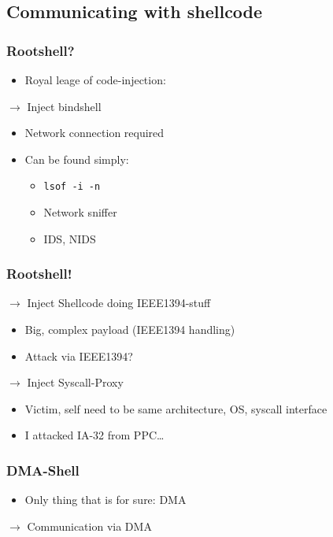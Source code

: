 \documentclass{beamer}
\begin{document}
	\subsection{Communicating with shellcode}

		\begin{frame} \frametitle{Rootshell?}
			\begin{itemize}
				\item Royal leage of code-injection: 
			\end{itemize}
			$\rightarrow$ Inject bindshell
			\begin{itemize}
				\item Network connection required
				\item Can be found simply:
				\begin{itemize}
					\item \texttt{lsof -i -n}
					\item Network sniffer
					\item IDS, NIDS
				\end{itemize}
			\end{itemize}
		\end{frame}

		\begin{frame} \frametitle{Rootshell!}
			$\rightarrow$ Inject Shellcode doing IEEE1394-stuff
			\begin{itemize}
				\item Big, complex payload (IEEE1394 handling)
				\item Attack via IEEE1394?
			\end{itemize}
			$\rightarrow$ Inject Syscall-Proxy
			\begin{itemize}
				\item Victim, self need to be same architecture, OS, syscall interface
				\item I attacked IA-32 from PPC\ldots
			\end{itemize}
		\end{frame}

		\begin{frame} \frametitle{DMA-Shell}
			\begin{itemize}
				\item Only thing that is for sure: DMA
			\end{itemize}
			$\rightarrow$ Communication via DMA
		\end{frame}
		
\end{document}
